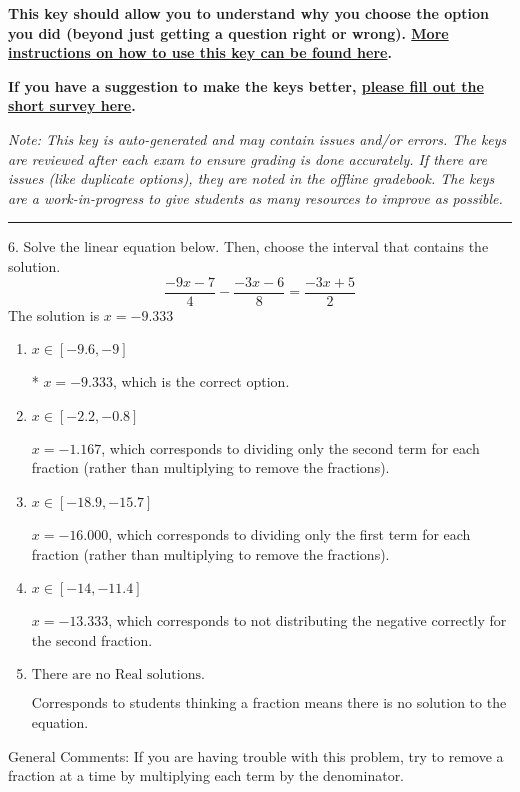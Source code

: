 \documentclass{article}[14pt]
\begin{document}
\textbf{This key should allow you to understand why you choose the option you did (beyond just getting a question right or wrong). \href{https://xronos.clas.ufl.edu/mac1105spring2020/courseDescriptionAndMisc/Exams/LearningFromResults}{More instructions on how to use this key can be found here}.}

\textbf{If you have a suggestion to make the keys better, \href{https://forms.gle/CZkbZmPbC9XALEE88}{please fill out the short survey here}.}

\textit{Note: This key is auto-generated and may contain issues and/or errors. The keys are reviewed after each exam to ensure grading is done accurately. If there are issues (like duplicate options), they are noted in the offline gradebook. The keys are a work-in-progress to give students as many resources to improve as possible.}

\rule{\textwidth}{0.4pt}

6. Solve the linear equation below. Then, choose the interval that contains the solution.
$$ \frac{-9 x - 7}{4} - \frac{-3 x - 6}{8} = \frac{-3 x + 5}{2} $$ 
The solution is $ x = -9.333 $ 

\begin{enumerate}[label=\Alph*.] 
\item $ x \in [-9.6, -9] $ 

 * $x = -9.333$, which is the correct option. 
\item $ x \in [-2.2, -0.8] $ 

  $x = -1.167$, which corresponds to dividing only the second term for each fraction (rather than multiplying to remove the fractions). 
\item $ x \in [-18.9, -15.7] $ 

  $x = -16.000$, which corresponds to dividing only the first term for each fraction (rather than multiplying to remove the fractions). 
\item $ x \in [-14, -11.4] $ 

  $x = -13.333$, which corresponds to not distributing the negative correctly for the second fraction. 
\item $ \text{There are no Real solutions.} $ 

 Corresponds to students thinking a fraction means there is no solution to the equation. 
\end{enumerate} 
 
General Comments: If you are having trouble with this problem, try to remove a fraction at a time by multiplying each term by the denominator.
\end{document}
